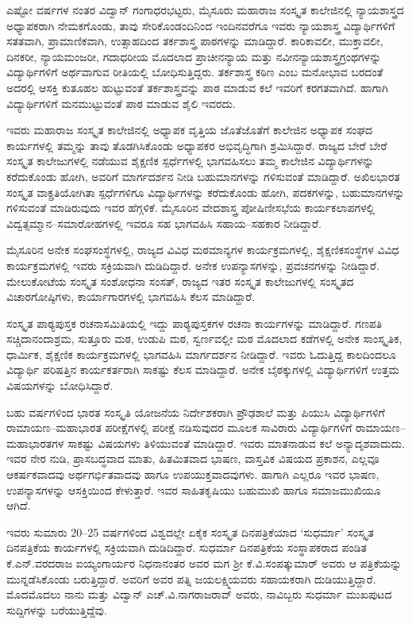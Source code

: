 ಎಷ್ಟೋ ವರ್ಷಗಳ ನಂತರ ವಿದ್ವಾನ್ ಗಂಗಾಧರಭಟ್ಟರು, ಮೈಸೂರು ಮಹಾರಾಜ ಸಂಸ್ಕೃತ ಕಾಲೇಜಿನಲ್ಲಿ ನ್ಯಾಯಶಾಸ್ತ್ರದ ಅಧ್ಯಾಪಕರಾಗಿ ನೇಮಕಗೊಂಡು, ತಾವು ಸೇರಿಕೊಂಡಂದಿನಿಂದ ಇಂದಿನವರೆಗೂ ಇವರು ನ್ಯಾಯಶಾಸ್ತ್ರ ವಿದ್ಯಾರ್ಥಿಗಳಿಗೆ ಸತತವಾಗಿ, ಪ್ರಾಮಾಣಿಕವಾಗಿ, ಉತ್ಸಾಹದಿಂದ ತರ್ಕಶಾಸ್ತ್ರ ಪಾಠಗಳನ್ನು ಮಾಡಿದ್ದಾರೆ. ಕಾರಿಕಾವಲೀ, ಮುಕ್ತಾವಲೀ, ದಿನಕರೀ, ನ್ಯಾಯಮಂಜರೀ, ಗದಾಧರೀಯ ಮೊದಲಾದ ಪ್ರಾಚೀನನ್ಯಾಯ ಮತ್ತು ನವೀನನ್ಯಾಯಶಾಸ್ತ್ರಗ್ರಂಥಗಳನ್ನು ವಿದ್ಯಾರ್ಥಿಗಳಿಗೆ ಅರ್ಥವಾಗುವ ರೀತಿಯಲ್ಲಿ ಬೋಧಿಸುತ್ತಿದ್ದರು. ತರ್ಕಶಾಸ್ತ್ರ ಕಠಿಣ ಎಂಬ ಮನೋಭಾವ ಬರದಂತೆ ಅದರಲ್ಲಿ ಆಸಕ್ತಿ ಕುತೂಹಲ ಹುಟ್ಟುವಂತೆ ತರ್ಕಶಾಸ್ತ್ರವನ್ನು ಪಾಠ ಮಾಡುವ ಕಲೆ ಇವರಿಗೆ ಕರಗತವಾಗಿದೆ. ಹಾಗಾಗಿ ವಿದ್ಯಾರ್ಥಿಗಳಿಗೆ ಮನಮುಟ್ಟುವಂತೆ ಪಾಠ ಮಾಡುವ ಶೈಲಿ ಇವರದು.

ಇವರು ಮಹಾರಾಜ ಸಂಸ್ಕೃತ ಕಾಲೇಜಿನಲ್ಲಿ ಅಧ್ಯಾಪಕ ವೃತ್ತಿಯ ಜೊತೆಜೊತೆಗೆ ಕಾಲೇಜಿನ ಅಧ್ಯಾಪಕ ಸಂಘದ ಕಾರ್ಯಗಳಲ್ಲಿ ತಮ್ಮನ್ನು ತಾವು ತೊಡಗಿಸಿಕೊಂಡು ಅಧ್ಯಾಪಕರ ಅಭಿವೃದ್ಧಿಗಾಗಿ ಶ್ರಮಿಸಿದ್ದಾರೆ. ರಾಜ್ಯದ ಬೇರೆ ಬೇರೆ ಸಂಸ್ಕೃತ ಕಾಲೇಜುಗಳಲ್ಲಿ ನಡೆಯುವ ಶೈಕ್ಷಣಿಕ ಸ್ಪರ್ಧೆಗಳಲ್ಲಿ ಭಾಗವಹಿಸಲು ತಮ್ಮ ಕಾಲೇಜಿನ ವಿದ್ಯಾರ್ಥಿಗಳನ್ನು ಕರೆದುಕೊಂಡು ಹೋಗಿ, ಅವರಿಗೆ ಮಾರ್ಗದರ್ಶನ ನೀಡಿ ಬಹುಮಾನಗಳನ್ನು ಗಳಿಸುವಂತೆ ಮಾಡಿದ್ದಾರೆ. ಅಖಿಲಭಾರತ ಸಂಸ್ಕೃತ ವಾಕ್ಪ್ರತಿಯೋಗಿತಾ ಸ್ಪರ್ಧೆಗಳಿಗೂ ವಿದ್ಯಾರ್ಥಿಗಳನ್ನು ಕರೆದುಕೊಂಡು ಹೋಗಿ, ಪದಕಗಳನ್ನು, ಬಹುಮಾನಗಳನ್ನು ಗಳಿಸುವಂತೆ ಮಾಡಿರುವುದು ಇವರ ಹೆಗ್ಗಳಿಕೆ. ಮೈಸೂರಿನ ವೇದಶಾಸ್ತ್ರ ಪೋಷಿಣೀಸಭೆಯ ಕಾರ್ಯಕಲಾಪಗಳಲ್ಲಿ ವಿದ್ವತ್ಸಮ್ಮಾನ–ಸಮಾರೋಹಗಳಲ್ಲಿ ಇವರೂ ಸಹ ಭಾಗವಹಿಸಿ ಸಹಾಯ–ಸಹಕಾರ ನೀಡಿದ್ದಾರೆ.

ಮೈಸೂರಿನ ಅನೇಕ ಸಂಘಸಂಸ್ಥೆಗಳಲ್ಲಿ, ರಾಜ್ಯದ ವಿವಿಧ ಮಠಮಾನ್ಯಗಳ ಕಾರ್ಯಕ್ರಮಗಳಲ್ಲಿ, ಶೈಕ್ಷಣಿಕಸಂಸ್ಥೆಗಳ ವಿವಿಧ ಕಾರ್ಯಕ್ರಮಗಳಲ್ಲಿ ಇವರು ಸಕ್ರಿಯವಾಗಿ ದುಡಿದಿದ್ದಾರೆ. ಅನೇಕ ಉಪನ್ಯಾಸಗಳನ್ನು, ಪ್ರವಚನಗಳನ್ನು ನೀಡಿದ್ದಾರೆ. ಮೇಲುಕೋಟೆಯ ಸಂಸ್ಕೃತ ಸಂಶೋಧನಾ ಸಂಸತ್, ರಾಜ್ಯದ ಇತರ ಸಂಸ್ಕೃತ ಕಾಲೇಜುಗಳಲ್ಲಿ ಸಂಸ್ಕೃತದ ವಿಚಾರಗೋಷ್ಠಿಗಳು, ಕಾರ್ಯಾಗಾರಗಳಲ್ಲಿ ಭಾಗವಹಿಸಿ ಕೆಲಸ ಮಾಡಿದ್ದಾರೆ. 

ಸಂಸ್ಕೃತ ಪಾಠ್ಯಪುಸ್ತಕ ರಚನಾಸಮಿತಿಯಲ್ಲಿ ಇದ್ದು ಪಾಠ್ಯಪುಸ್ತಕಗಳ ರಚನಾ ಕಾರ್ಯಗಳನ್ನು ಮಾಡಿದ್ದಾರೆ. ಗಣಪತಿ ಸಚ್ಚಿದಾನಂದಾಶ್ರಮ, ಸುತ್ತೂರು ಮಠ, ಉಡುಪಿ ಮಠ, ಸ್ವರ್ಣವಲ್ಲೀ ಮಠ ಮೊದಲಾದ ಕಡೆಗಳಲ್ಲಿ ಅನೇಕ ಸಾಂಸ್ಕೃತಿಕ, ಧಾರ್ಮಿಕ, ಶೈಕ್ಷಣಿಕ ಕಾರ್ಯಕ್ರಮಗಳಲ್ಲಿ ಭಾಗವಹಿಸಿ ಮಾರ್ಗದರ್ಶನ ನೀಡಿದ್ದಾರೆ. ಇವರು ಓದುತ್ತಿದ್ದ ಕಾಲದಿಂದಲೂ ವಿದ್ಯಾರ್ಥಿ ಪರಿಷತ್ತಿನ ಕಾರ್ಯಕರ್ತರಾಗಿ ಸಾಕಷ್ಟು ಕೆಲಸ ಮಾಡಿದ್ದಾರೆ. ಅನೇಕ ಬೈಠಕ್ಕುಗಳಲ್ಲಿ ವಿದ್ಯಾರ್ಥಿಗಳಿಗೆ ಉತ್ತಮ ವಿಷಯಗಳನ್ನು ಬೋಧಿಸಿದ್ದಾರೆ. 

ಬಹು ವರ್ಷಗಳಿಂದ ಭಾರತ ಸಂಸ್ಕೃತಿ ಯೋಜನೆಯ ನಿರ್ದೇಶಕರಾಗಿ ಪ್ರೌಢಶಾಲೆ ಮತ್ತು ಪಿಯುಸಿ ವಿದ್ಯಾರ್ಥಿಗಳಿಗೆ ರಾಮಾಯಣ–ಮಹಾಭಾರತ ಪರೀಕ್ಷೆಗಳಲ್ಲಿ ಪರೀಕ್ಷೆ ನಡಿಸುವುದರ ಮೂಲಕ ಸಾವಿರಾರು ವಿದ್ಯಾರ್ಥಿಗಳಿಗೆ ರಾಮಾಯಣ–ಮಹಾಭಾರತಗಳ ಸಾಕಷ್ಟು ವಿಷಯಗಳು ತಿಳಿಯುವಂತೆ ಮಾಡಿದ್ದಾರೆ. ಇವರು ಮಾತನಾಡುವ ಕಲೆ ಅನ್ಯಾದೃಶವಾದುದು. ಇವರ ನೇರ ನುಡಿ, ಪ್ರಾಸಬದ್ಧವಾದ ಮಾತು, ಹಿತಮಿತವಾದ ಭಾಷಣ, ವಾಸ್ತವಿಕ ವಿಷಯದ ಪ್ರಕಾಶನ, ಎಲ್ಲವೂ ಆಕರ್ಷಕವಾದವು ಅರ್ಥಗರ್ಭಿತವಾದವು ಹಾಗೂ ಉಪಯುಕ್ತವಾದವುಗಳು. ಹಾಗಾಗಿ ಎಲ್ಲರೂ ಇವರ ಭಾಷಣ, ಉಪನ್ಯಾಸಗಳನ್ನು ಆಸಕ್ತಿಯಿಂದ ಕೇಳುತ್ತಾರೆ. ಇವರ ಸಾಹಿತಕೃಷಿಯು ಬಹುಮುಖಿ ಹಾಗೂ ಸಮಾಜಮುಖಿಯೂ ಆಗಿದೆ.

ಇವರು ಸುಮಾರು 20–25 ವರ್ಷಗಳಿಂದ ವಿಶ್ವದಲ್ಲೇ ಏಕೈಕ ಸಂಸ್ಕೃತ ದಿನಪತ್ರಿಕೆಯಾದ ‘ಸುಧರ್ಮಾ’ ಸಂಸ್ಕೃತ ದಿನಪತ್ರಿಕೆಯ ಕಾರ್ಯಗಳಲ್ಲಿ ಸಕ್ರಿಯವಾಗಿ ದುಡಿದಿದ್ದಾರೆ. ಸುಧರ್ಮಾ ದಿನಪತ್ರಿಕೆಯ ಸಂಸ್ಥಾಪಕರಾದ ಪಂಡಿತ ಕೆ.ಎನ್.ವರದರಾಜ ಐಯ್ಯಂಗಾರ್ಯರ ನಿಧನಾನಂತರ ಅವರ ಮಗ ಶ್ರೀ ಕೆ.ವಿ.ಸಂಪತ್ಕುಮಾರ್ ಅವರು ಆ ಪತ್ರಿಕೆಯನ್ನು ಮುನ್ನಡೆಸಿಕೊಂಡು ಬರುತ್ತಿದ್ದಾರೆ. ಅವರಿಗೆ ಅವರ ಪತ್ನಿ ಜಯಲಕ್ಷ್ಮಿಯವರು ಸಹಾಯಕರಾಗಿ ದುಡಿಯುತ್ತಿದ್ದಾರೆ. ಮೊದಮೊದಲು ನಾನು ಮತ್ತು ವಿದ್ವಾನ್ ಎಚ್.ವಿ.ನಾಗರಾಜರಾವ್ ಅವರು, ನಾವಿಬ್ಬರು ಸುಧರ್ಮಾ ಮುಖಪುಟದ ಸುದ್ದಿಗಳನ್ನು ಬರೆಯುತ್ತಿದ್ದೆವು. 

